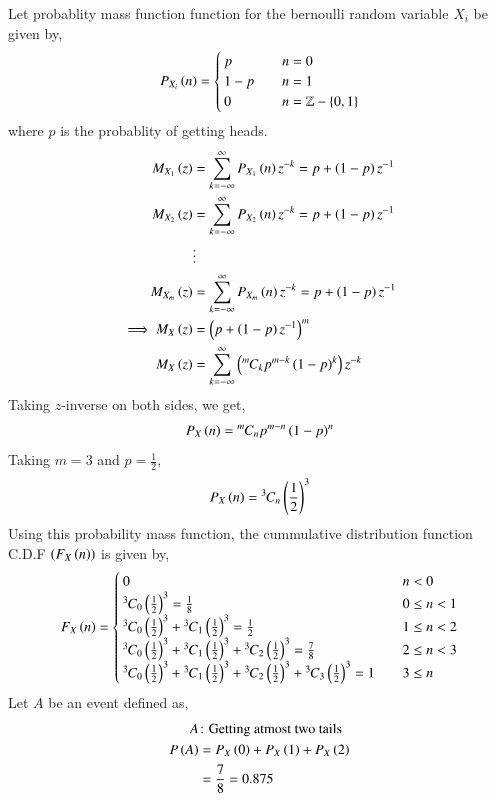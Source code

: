 \documentclass[journal]{IEEEtran}
\begin{document}
Let probablity mass function function for the bernoulli random variable $X_{i}$ be given by,
\begin{align}
    P_{X_{i}}\left(n\right) = \begin{cases}
        p & \quad n = 0\\
        1 - p & \quad n = 1\\
        0 & \quad n = \mathbb{Z} - \left\{0, 1\right\}
    \end{cases}
\end{align}
where $p$ is the probablity of getting heads.
\begin{align}
    M_{X_1}\left(z\right) &= \sum_{k = -\infty}^{\infty} P_{X_{1}}\left(n\right) z^{-k} = p + \left(1 - p\right) z^{-1}\\
    M_{X_2}\left(z\right) &= \sum_{k = -\infty}^{\infty} P_{X_{2}}\left(n\right) z^{-k} = p + \left(1 - p\right) z^{-1}\\
                    &\vdots\\
    M_{X_m}\left(z\right) &= \sum_{k = -\infty}^{\infty} P_{X_{m}}\left(n\right) z^{-k} = p + \left(1 - p\right) z^{-1}\\
    \implies M_{X}\left(z\right) &= \left(p + \left(1 - p\right) z^{-1}\right)^{m}\\
    M_{X}\left(z\right) &= \sum_{k = -\infty}^{\infty} \left({{}^{m}\mkern-1muC_{k}} p^{m - k} \left(1 - p\right)^{k}\right) z^{-k}\\
\end{align}
Taking $z$-inverse on both sides, we get,
\begin{align}
    P_{X}\left(n\right) = {{}^{m}\mkern-1muC_{n}} p^{m - n} \left(1 - p\right)^{n}
\end{align}
Taking $m = 3$ and $p = \frac{1}{2}$,
\begin{align}
    P_{X}\left(n\right) = {{}^{3}\mkern-1muC_{n}} \left(\frac{1}{2}\right)^{3}
\end{align}
Using this probability mass function, the cummulative distribution function C.D.F $\left(F_{X}\left(n\right)\right)$ is given by,
\begin{align}
    F_{X}\left(n\right) = \begin{cases}
        0 & \quad n < 0\\
        {{}^{3}\mkern-1muC_{0}}\left(\frac{1}{2}\right)^3 = \frac{1}{8} & \quad 0 \leq n < 1\\
        {{}^{3}\mkern-1muC_{0}}\left(\frac{1}{2}\right)^3 + {{}^{3}\mkern-1muC_{1}}\left(\frac{1}{2}\right)^3 = \frac{1}{2} & \quad 1 \leq n < 2\\
        {{}^{3}\mkern-1muC_{0}}\left(\frac{1}{2}\right)^3 + {{}^{3}\mkern-1muC_{1}}\left(\frac{1}{2}\right)^3 + {{}^{3}\mkern-1muC_{2}}\left(\frac{1}{2}\right)^3 = \frac{7}{8} & \quad 2 \leq n < 3\\
        {{}^{3}\mkern-1muC_{0}}\left(\frac{1}{2}\right)^3 + {{}^{3}\mkern-1muC_{1}}\left(\frac{1}{2}\right)^3 + {{}^{3}\mkern-1muC_{2}}\left(\frac{1}{2}\right)^3 + {{}^{3}\mkern-1muC_{3}}\left(\frac{1}{2}\right)^3 = 1 & \quad 3 \leq n
    \end{cases}
\end{align}
Let $A$ be an event defined as,
\begin{align}
    A&\colon\text{Getting atmost two tails}\\
    P\left(A\right) &= P_{X}\left(0\right) + P_{X}\left(1\right) + P_{X}\left(2\right)\\
              &= \frac{7}{8} = 0.875
\end{align}
\end{document}

